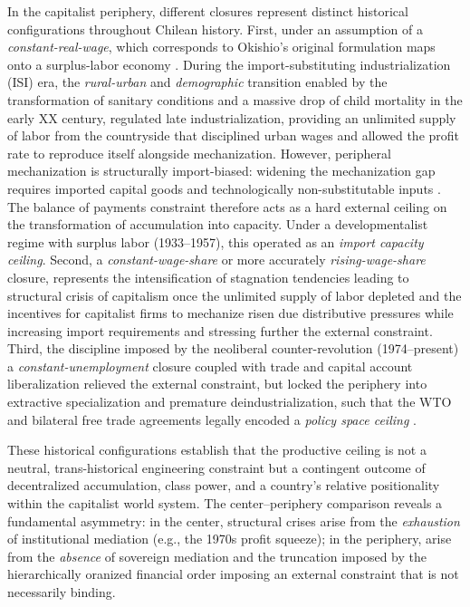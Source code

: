 In the capitalist periphery, different closures represent distinct historical configurations throughout Chilean history. First, under an assumption of a
\textit{constant-real-wage}, which corresponds to
Okishio's original formulation maps onto a surplus-labor
economy \citep{Lewis1954, Basu2026}. During the
import-substituting industrialization (ISI) era, the
\textit{rural-urban} and \textit{demographic} transition enabled by the transformation of sanitary conditions and a massive drop of child mortality in the early XX century,  regulated late industrialization, providing an unlimited supply of labor from the countryside that disciplined urban wages and allowed the profit rate to reproduce itself alongside mechanization. 
However, peripheral mechanization is structurally import-biased:
widening the mechanization gap requires imported capital
goods and technologically non-substitutable inputs
\citep{Prebisch1981}. The balance of payments constraint
therefore acts as a hard external ceiling on the
transformation of accumulation into capacity. Under a
developmentalist regime with surplus labor (1933--1957), this operated as an
\textit{import capacity ceiling}. Second, a \textit{constant-wage-share} or more accurately \textit{rising-wage-share} closure, represents the intensification of stagnation tendencies leading to structural crisis of capitalism once the unlimited supply of labor depleted and the incentives for capitalist firms to mechanize risen due distributive pressures while increasing import requirements and stressing further the external constraint. Third, the discipline imposed by the neoliberal counter-revolution \citep{Casals2021} (1974--present) a \textit{constant-unemployment} closure coupled with trade and capital account liberalization relieved the external constraint, but locked the periphery into extractive specialization and premature deindustrialization, such that the WTO and bilateral free
trade agreements legally encoded a \textit{policy space ceiling} \citep{Ahumada2019, Palma2019}.


These historical configurations establish that the productive
ceiling is not a neutral, trans-historical engineering
constraint but a contingent outcome of decentralized
accumulation, class power, and a country's relative
positionality within the capitalist world system. The
center--periphery comparison reveals a fundamental asymmetry:
in the center, structural crises arise from the
\textit{exhaustion} of institutional mediation (e.g., the
1970s profit squeeze); in the periphery, arise from
the \textit{absence} of sovereign mediation and the
truncation imposed by the hierarchically oranized financial order imposing 
an external constraint that is not necessarily binding. 